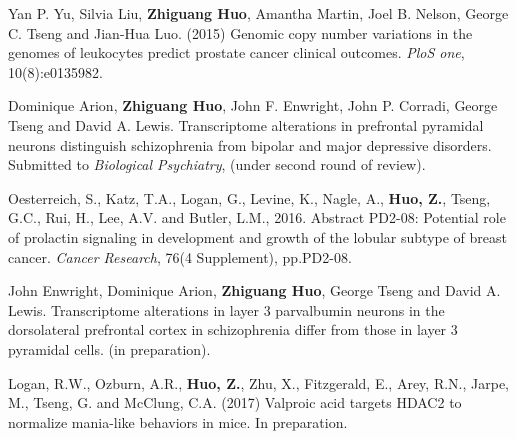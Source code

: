 \documentclass[a4paper, 10pt]{article}
\begin{document}
\begin{thebibliography}{9}
Yan P. Yu, Silvia Liu, {\bf Zhiguang Huo}, Amantha Martin, Joel B. Nelson, George C. Tseng and Jian-Hua Luo. (2015) Genomic copy number variations in the genomes of leukocytes predict prostate cancer clinical outcomes. \emph{PloS one}, 10(8):e0135982.

    
Dominique Arion, {\bf Zhiguang Huo}, John F. Enwright, John P. Corradi, George Tseng and David A. Lewis.
Transcriptome alterations in prefrontal pyramidal neurons distinguish schizophrenia from bipolar and major depressive disorders.
Submitted to \emph{Biological Psychiatry}, (under second round of review).



Oesterreich, S., Katz, T.A., Logan, G., Levine, K., Nagle, A., {\bf Huo, Z.}, Tseng, G.C., Rui, H., Lee, A.V. and Butler, L.M., 2016. Abstract PD2-08: Potential role of prolactin signaling in development and growth of the lobular subtype of breast cancer. \emph{Cancer Research}, 76(4 Supplement), pp.PD2-08.

John Enwright,  Dominique Arion, {\bf Zhiguang Huo}, George Tseng and David A. Lewis. 
Transcriptome alterations in layer 3 parvalbumin neurons in the dorsolateral prefrontal cortex in schizophrenia differ from those in layer 3 pyramidal cells.
(in preparation).

 Logan, R.W., Ozburn, A.R., {\bf Huo, Z.}, Zhu, X., Fitzgerald, E., Arey, R.N., Jarpe, M., Tseng, G. and McClung, C.A. (2017)
Valproic acid targets HDAC2 to normalize mania-like behaviors in mice. In preparation.




\end{thebibliography}
\end{document}
